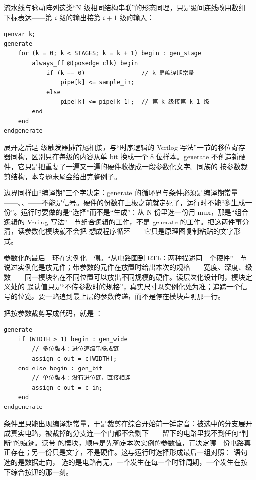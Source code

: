 流水线与脉动阵列这类“N 级相同结构串联”的形态同理，只是级间连线改用数组下标表达——第 $i$ 级的输出接第 $i+1$ 级的输入：

\begin{lstlisting}
genvar k;
generate
    for (k = 0; k < STAGES; k = k + 1) begin : gen_stage
        always_ff @(posedge clk) begin
            if (k == 0)                // k 是编译期常量
                pipe[k] <= sample_in;
            else
                pipe[k] <= pipe[k-1];  // 第 k 级接第 k-1 级
        end
    end
endgenerate
\end{lstlisting}

展开之后是  级触发器排首尾相接，与“时序逻辑的 Verilog 写法”一节的移位寄存器同构，区别只在每级的内容从单 bit 换成一个 8 位样本。generate 不创造新硬件，它只是把重复了一遍又一遍的硬件收拢成一段参数化文字。同族的  按参数裁剪结构，本专题末尾会给出完整例子。

边界同样由“编译期”三个字决定：generate 的循环界与条件必须是编译期常量——、、——不能是信号。硬件的份数在上板之前就定死了，运行时不能“多生成一份”。运行时要做的是“选择”而不是“生成”：从 N 份里选一份用 mux，那是“组合逻辑的 Verilog 写法”一节组合逻辑的工作，不是 generate 的工作。把这两件事分清，读参数化模块就不会把  想成程序循环——它只是原理图复制粘贴的文字形式。

参数化的最后一环在实例化一侧。“从电路图到 RTL：两种描述同一个硬件”一节说过实例化是放元件；带参数的元件在放置时给出本次的规格——宽度、深度、级数——同一模块名在不同位置可以放出不同规模的硬件。读层次化设计时，模块定义处的  默认值只是“不传参数时的规格”，真实尺寸以实例化处为准；追踪一个信号的位宽，要一路追到最上层的参数传递，而不是停在模块声明那一行。

把按参数裁剪写成代码，就是 ：

\begin{lstlisting}
generate
    if (WIDTH > 1) begin : gen_wide
        // 多位版本：进位逐级串联成链
        assign c_out = c[WIDTH];
    end else begin : gen_bit
        // 单位版本：没有进位链，直接相连
        assign c_out = c_in;
    end
endgenerate
\end{lstlisting}

条件里只能出现编译期常量，于是裁剪在综合开始前一锤定音：被选中的分支展开成真实电路，被裁掉的分支连一个门都不会剩下——留下的电路里找不到任何“判断”的痕迹。读带  的模块，顺序是先确定本次实例的参数值，再决定哪一份电路真正存在；另一份只是文字，不是硬件。这与运行时选择形成最后一组对照： 语句选的是数据走向， 选的是电路有无，一个发生在每一个时钟周期，一个发生在按下综合按钮的那一刻。

